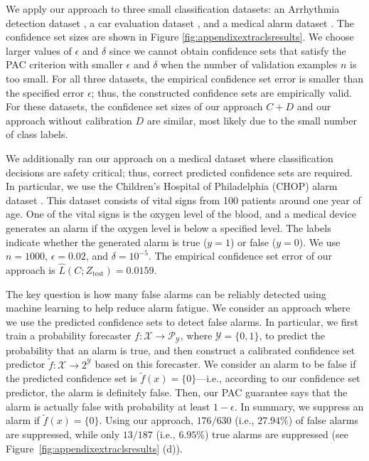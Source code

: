 \documentclass{article} \usepackage{iclr2020_conference,times}
\renewcommand{\(}						{\left(}
\renewcommand{\)}						{\right)}
\renewcommand{\[}						{\left[}
\renewcommand{\]}						{\right]}
\newcommand{\<}						{\left<}
\renewcommand{\>}						{\right>}
\def\Lh{\hat{{L}}}
\begin{document}
We apply our approach to three small classification datasets: an Arrhythmia detection dataset \citep{guvenir1997supervised}, a car evaluation dataset \citep{bohanec1988knowledge}, and a medical alarm dataset \citep{bonafide2017video}. The confidence set sizes are shown in Figure \ref{fig:appendixextraclsresults}. We choose larger values of $\epsilon$ and $\delta$ since we cannot obtain confidence sets that satisfy the PAC criterion with smaller $\epsilon$ and $\delta$ when the number of validation examples $n$ is too small. For all three datasets, the empirical confidence set error is smaller than the specified error $\epsilon$; thus, the constructed confidence sets are empirically valid. For these datasets, the confidence set sizes of our approach $C+D$ and our approach without calibration $D$ are similar, most likely due to the small number of class labels.

We additionally ran our approach on a medical dataset where classification decisions are safety critical; thus, correct predicted confidence sets are required. 
In particular, we use the Children's Hospital of Philadelphia (CHOP) alarm dataset \citep{bonafide2017video}. 
This dataset consists of vital signs from 100 patients around one year of age. One of the vital signs is the oxygen level of the blood, and a medical device generates an alarm if the oxygen level is below a specified level. The labels indicate whether the generated alarm is true ($y=1$) or false ($y=0$).
We use $n = 1000$, $\epsilon = 0.02$, and $\delta = 10^{-5}$. The empirical confidence set error of our approach is $\Lh(C; Z_\text{test}) = 0.0159$.

The key question is how many false alarms can be reliably detected using machine learning to help reduce alarm fatigue. We consider an approach where we use the predicted confidence sets to detect false alarms. In particular, we first train a probability forecaster $f:\mathcal{X}\to\mathcal{P}_{\mathcal{Y}}$, where $\mathcal{Y}=\{0,1\}$, to predict the probability that an alarm is true, and then construct a calibrated confidence set predictor $\tilde{f}:\mathcal{X}\to2^{\mathcal{Y}}$ based on this forecaster. We consider an alarm to be false if the predicted confidence set is $\tilde{f}(x)=\{0\}$---i.e., according to our confidence set predictor, the alarm is definitely false. Then, our PAC guarantee says that the alarm is actually false with probability at least $1-\epsilon$. In summary, we suppress an alarm if $\tilde{f}(x)=\{0\}$. Using our approach, $176/630$ (i.e., $27.94\%$) of false alarms are suppressed, while only $13/187$ (i.e., $6.95\%$) true alarms are suppressed (see Figure~\ref{fig:appendixextraclsresults} (d)).
\end{document}

